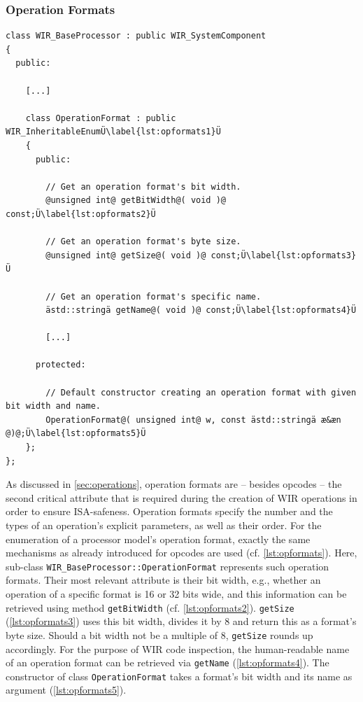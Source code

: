 \subsubsection{Operation Formats}
\label{sssec:opformats}

\begin{lstlisting}[style=code,float=t,caption={Generic Operation Format Handling of Class \texttt{WIR\_BaseProcessor}},label=lst:opformats]
class WIR_BaseProcessor : public WIR_SystemComponent
{
  public:

    [...]

    class OperationFormat : public WIR_InheritableEnumÜ\label{lst:opformats1}Ü
    {
      public:

        // Get an operation format's bit width.
        @unsigned int@ getBitWidth@( void )@ const;Ü\label{lst:opformats2}Ü

        // Get an operation format's byte size.
        @unsigned int@ getSize@( void )@ const;Ü\label{lst:opformats3}Ü

        // Get an operation format's specific name.
        ästd::stringä getName@( void )@ const;Ü\label{lst:opformats4}Ü

        [...]

      protected:

        // Default constructor creating an operation format with given bit width and name.
        OperationFormat@( unsigned int@ w, const ästd::stringä æ&æn @)@;Ü\label{lst:opformats5}Ü
    };
};
\end{lstlisting}

As discussed in \cref{sec:operations}, operation formats are -- besides opcodes -- the second critical attribute that is required during the creation of \gls{WIR} operations in order to ensure \gls{ISA}-safeness.
Operation formats specify the number and the types of an operation's explicit parameters, as well as their order.
For the enumeration of a processor model's operation format, exactly the same mechanisms as already introduced for opcodes are used (cf. \cref{lst:opformats}).
Here, sub-class \texttt{WIR\_BaseProcessor::OperationFormat} represents such operation formats.
Their most relevant attribute is their bit width, e.g., whether an operation of a specific format is 16 or 32 bits wide, and this information can be retrieved using method \texttt{getBitWidth} (cf. \cref{lst:opformats2}).
\texttt{getSize} (\cref{lst:opformats3}) uses this bit width, divides it by 8 and return this as a format's byte size.
Should a bit width not be a multiple of 8, \texttt{getSize} rounds up accordingly.
For the purpose of \gls{WIR} code inspection, the human-readable name of an operation format can be retrieved via \texttt{getName} (\cref{lst:opformats4}).
The constructor of class \texttt{OperationFormat} takes a format's bit width and its name as argument (\cref{lst:opformats5}).

